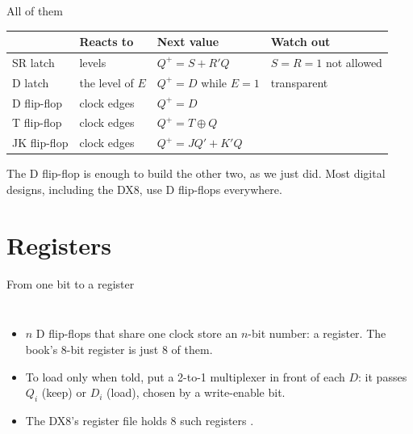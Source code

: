 \documentclass[10pt]{wosm-slides}
\begin{document}
\begin{frame}{All of them}
  \begin{center}
    \begin{tabular}{@{}llll@{}}
      \toprule
      & Reacts to & Next value & Watch out \\
      \midrule
      SR latch & levels & $Q^{+} = S + R' Q$ & $S = R = 1$ not allowed \\
      D latch & the level of $E$ & $Q^{+} = D$ while $E = 1$ & transparent \\
      D flip-flop & clock edges & $Q^{+} = D$ & \\
      T flip-flop & clock edges & $Q^{+} = T \oplus Q$ & \\
      JK flip-flop & clock edges & $Q^{+} = J Q' + K' Q$ & \\
      \bottomrule
    \end{tabular}
  \end{center}

  \bigskip
  \begin{remark}
    The D flip-flop is enough to build the other two, as we just did. Most digital
    designs, including the DX8, use D flip-flops everywhere.
  \end{remark}
\end{frame}

\section{Registers}

\begin{frame}{From one bit to a register}
  \begin{columns}[c, totalwidth=\textwidth]
      \centering
      \begin{itemize}
        \item $n$ D flip-flops that share one clock store an $n$-bit number: a
          \alert{register}. The book's 8-bit register is just 8 of them.
        \item To load only when told, put a 2-to-1 multiplexer in front of each $D$:
          it passes $Q_i$ (keep) or $D_i$ (load), chosen by a write-enable bit.
        \item The DX8's register file holds 8 such registers .
      \end{itemize}
  \end{columns}
\end{frame}
\end{document}
